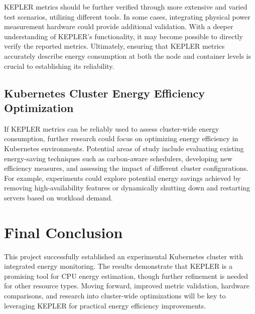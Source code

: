 KEPLER metrics should be further verified through more extensive and varied test scenarios, utilizing different tools. In some cases, integrating physical power measurement hardware could provide additional validation. With a deeper understanding of KEPLER’s functionality, it may become possible to directly verify the reported metrics. Ultimately, ensuring that KEPLER metrics accurately describe energy consumption at both the node and container levels is crucial to establishing its reliability.

\subsection{Kubernetes Cluster Energy Efficiency Optimization}

If KEPLER metrics can be reliably used to assess cluster-wide energy consumption, further research could focus on optimizing energy efficiency in Kubernetes environments. Potential areas of study include evaluating existing energy-saving techniques such as carbon-aware schedulers, developing new efficiency measures, and assessing the impact of different cluster configurations. For example, experiments could explore potential energy savings achieved by removing high-availability features or dynamically shutting down and restarting servers based on workload demand.

\section{Final Conclusion}

This project successfully established an experimental Kubernetes cluster with integrated energy monitoring. The results demonstrate that KEPLER is a promising tool for CPU energy estimation, though further refinement is needed for other resource types. Moving forward, improved metric validation, hardware comparisons, and research into cluster-wide optimizations will be key to leveraging KEPLER for practical energy efficiency improvements.